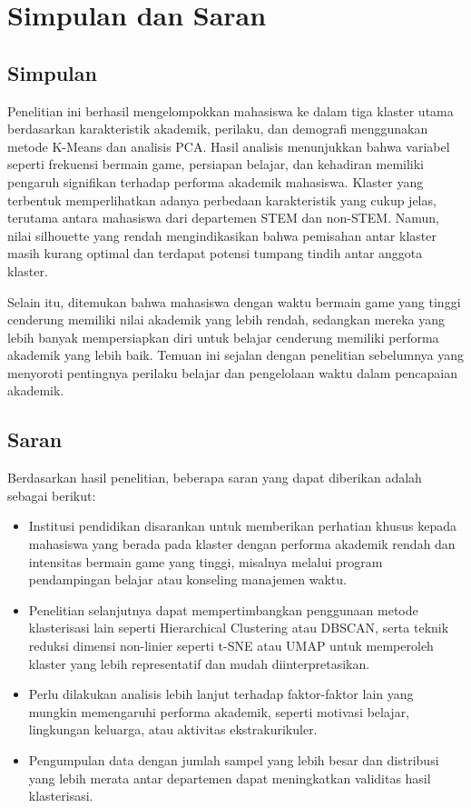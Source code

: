 \section{Simpulan dan Saran}
\subsection{Simpulan}
Penelitian ini berhasil mengelompokkan mahasiswa ke dalam tiga klaster utama berdasarkan karakteristik akademik, perilaku, dan demografi menggunakan metode K-Means dan analisis PCA. Hasil analisis menunjukkan bahwa variabel seperti frekuensi bermain game, persiapan belajar, dan kehadiran memiliki pengaruh signifikan terhadap performa akademik mahasiswa. Klaster yang terbentuk memperlihatkan adanya perbedaan karakteristik yang cukup jelas, terutama antara mahasiswa dari departemen STEM dan non-STEM. Namun, nilai silhouette yang rendah mengindikasikan bahwa pemisahan antar klaster masih kurang optimal dan terdapat potensi tumpang tindih antar anggota klaster.

Selain itu, ditemukan bahwa mahasiswa dengan waktu bermain game yang tinggi cenderung memiliki nilai akademik yang lebih rendah, sedangkan mereka yang lebih banyak mempersiapkan diri untuk belajar cenderung memiliki performa akademik yang lebih baik. Temuan ini sejalan dengan penelitian sebelumnya yang menyoroti pentingnya perilaku belajar dan pengelolaan waktu dalam pencapaian akademik.

\subsection{Saran}
Berdasarkan hasil penelitian, beberapa saran yang dapat diberikan adalah sebagai berikut:
\begin{itemize}
    \item Institusi pendidikan disarankan untuk memberikan perhatian khusus kepada mahasiswa yang berada pada klaster dengan performa akademik rendah dan intensitas bermain game yang tinggi, misalnya melalui program pendampingan belajar atau konseling manajemen waktu.
    \item Penelitian selanjutnya dapat mempertimbangkan penggunaan metode klasterisasi lain seperti Hierarchical Clustering atau DBSCAN, serta teknik reduksi dimensi non-linier seperti t-SNE atau UMAP untuk memperoleh klaster yang lebih representatif dan mudah diinterpretasikan.
    \item Perlu dilakukan analisis lebih lanjut terhadap faktor-faktor lain yang mungkin memengaruhi performa akademik, seperti motivasi belajar, lingkungan keluarga, atau aktivitas ekstrakurikuler.
    \item Pengumpulan data dengan jumlah sampel yang lebih besar dan distribusi yang lebih merata antar departemen dapat meningkatkan validitas hasil klasterisasi.
\end{itemize}

\pagebreak

